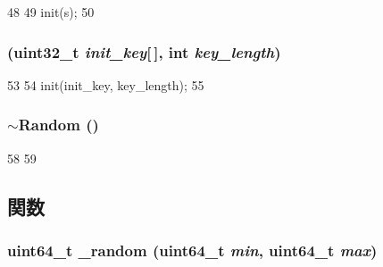 \begin{DoxyCode}
48 {
49     init(s);
50 }
\end{DoxyCode}
\hypertarget{classRandom_ae435e1c7490c18469912b75b02913d74}{
\subsubsection[{Random}]{ ({\bf uint32\_\-t} {\em init\_\-key}\mbox{[}$\,$\mbox{]}, \/  int {\em key\_\-length})}}
\label{classRandom_ae435e1c7490c18469912b75b02913d74}



\begin{DoxyCode}
53 {
54     init(init_key, key_length);
55 }
\end{DoxyCode}
\hypertarget{classRandom_a70c16ca0bcf0c1d2b4fdbc8b0948af9b}{
\subsubsection[{$\sim$Random}]{\setlength{\rightskip}{0pt plus 5cm}$\sim${\bf Random} ()}}
\label{classRandom_a70c16ca0bcf0c1d2b4fdbc8b0948af9b}



\begin{DoxyCode}
58 {
59 }
\end{DoxyCode}


\subsection{関数}
\hypertarget{classRandom_a05a49bba57cbef5cebd4d7d34e0d937d}{
\subsubsection[{\_\-random}]{\setlength{\rightskip}{0pt plus 5cm}uint64\_\-t \_\-random (uint64\_\-t {\em min}, \/  uint64\_\-t {\em max})}}
\label{classRandom_a05a49bba57cbef5cebd4d7d34e0d937d}



